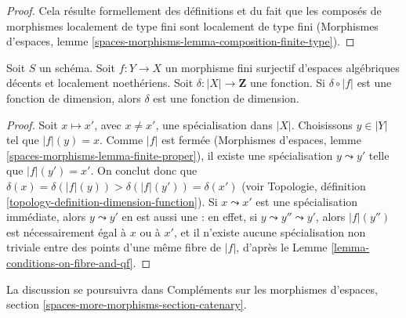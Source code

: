 \begin{proof}
Cela résulte formellement des définitions et du fait que les composés de
morphismes localement de type fini sont localement de type fini
(Morphismes d'espaces, lemme
\ref{spaces-morphisms-lemma-composition-finite-type}).
\end{proof}

\begin{lemma}
\label{lemma-check-dimension-function-finite-cover}
Soit $S$ un schéma. Soit $f : Y \to X$ un morphisme fini surjectif d'espaces
algébriques décents et localement noethériens. Soit
$\delta : |X| \to \mathbf{Z}$ une fonction. Si $\delta \circ |f|$ est une
fonction de dimension, alors $\delta$ est une fonction de dimension.
\end{lemma}

\begin{proof}
Soit $x \mapsto x'$, avec $x \not = x'$, une spécialisation dans $|X|$.
Choisissons $y \in |Y|$ tel que $|f|(y) = x$. Comme $|f|$ est fermée
(Morphismes d'espaces, lemme \ref{spaces-morphisms-lemma-finite-proper}),
il existe une spécialisation $y \leadsto y'$ telle que $|f|(y') = x'$.
On conclut donc que
$\delta(x) = \delta(|f|(y)) > \delta(|f|(y')) = \delta(x')$
(voir Topologie, définition \ref{topology-definition-dimension-function}).
Si $x \leadsto x'$ est une spécialisation immédiate, alors
$y \leadsto y'$ en est aussi une : en effet, si
$y \leadsto y'' \leadsto y'$, alors $|f|(y'')$ est nécessairement égal à
$x$ ou à $x'$, et il n'existe aucune spécialisation non triviale entre des
points d'une même fibre de $|f|$, d'après le
Lemme \ref{lemma-conditions-on-fibre-and-qf}.
\end{proof}

\noindent
La discussion se poursuivra dans Compléments sur les morphismes d'espaces,
section \ref{spaces-more-morphisms-section-catenary}.
















